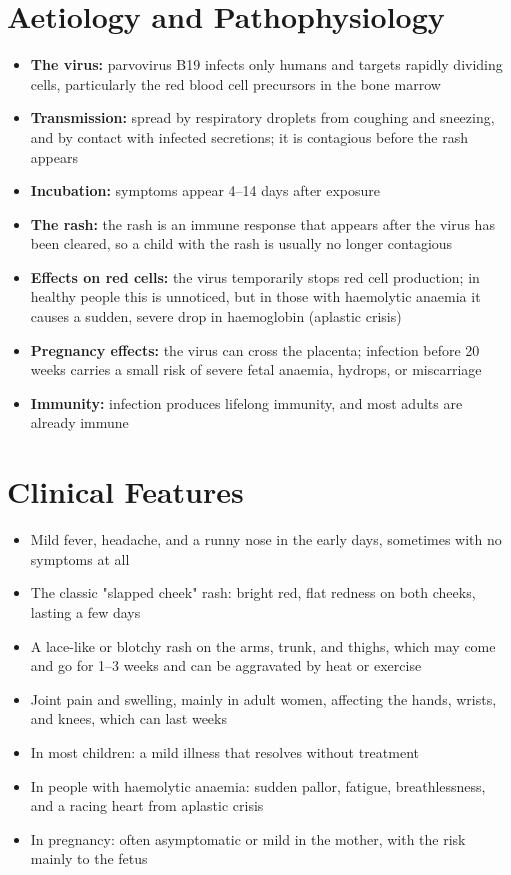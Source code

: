 \section*{Aetiology and Pathophysiology}
\begin{itemize}
    \item \textbf{The virus:} parvovirus B19 infects only humans and targets rapidly dividing cells, particularly the red blood cell precursors in the bone marrow
    \item \textbf{Transmission:} spread by respiratory droplets from coughing and sneezing, and by contact with infected secretions; it is contagious before the rash appears
    \item \textbf{Incubation:} symptoms appear 4--14 days after exposure
    \item \textbf{The rash:} the rash is an immune response that appears after the virus has been cleared, so a child with the rash is usually no longer contagious
    \item \textbf{Effects on red cells:} the virus temporarily stops red cell production; in healthy people this is unnoticed, but in those with haemolytic anaemia it causes a sudden, severe drop in haemoglobin (aplastic crisis)
    \item \textbf{Pregnancy effects:} the virus can cross the placenta; infection before 20 weeks carries a small risk of severe fetal anaemia, hydrops, or miscarriage
    \item \textbf{Immunity:} infection produces lifelong immunity, and most adults are already immune
\end{itemize}

\section*{Clinical Features}
\begin{itemize}
    \item Mild fever, headache, and a runny nose in the early days, sometimes with no symptoms at all
    \item The classic "slapped cheek" rash: bright red, flat redness on both cheeks, lasting a few days
    \item A lace-like or blotchy rash on the arms, trunk, and thighs, which may come and go for 1--3 weeks and can be aggravated by heat or exercise
    \item Joint pain and swelling, mainly in adult women, affecting the hands, wrists, and knees, which can last weeks
    \item In most children: a mild illness that resolves without treatment
    \item In people with haemolytic anaemia: sudden pallor, fatigue, breathlessness, and a racing heart from aplastic crisis
    \item In pregnancy: often asymptomatic or mild in the mother, with the risk mainly to the fetus
\end{itemize}

